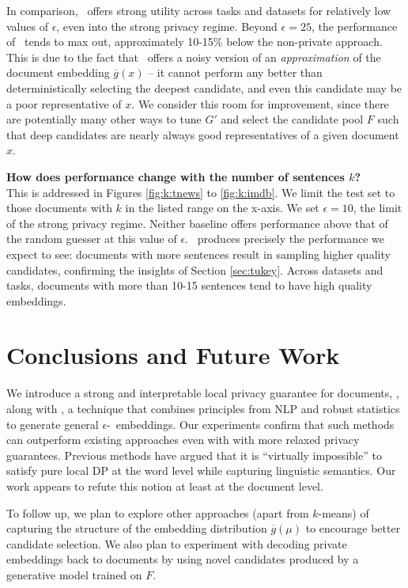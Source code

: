 In comparison, \technique\ offers strong utility across tasks and datasets for relatively low values of $\epsilon$, even into the strong privacy regime. Beyond $\epsilon = 25$, the performance of \technique\ tends to max out, approximately 10-15\% below the non-private approach. This is due to the fact that \technique\ offers a noisy version of an \emph{approximation} of the document embedding $\overline{g}(x)$ -- it cannot perform any better than deterministically selecting the deepest candidate, and even this candidate may be a poor representative of $x$. We consider this room for improvement, since there are potentially many other ways to tune $G'$ and select the candidate pool $F$ such that deep candidates are nearly always good representatives of a given document $x$. 

\noindent\textbf{How does performance change with the number of sentences $k$?}\\
This is addressed in Figures \ref{fig:k:tnews} to \ref{fig:k:imdb}. We limit the test set to those documents with $k$ in the listed range on the x-axis. We set $\epsilon = 10$, the limit of the strong privacy regime. Neither baseline offers performance above that of the random guesser at this value of $\epsilon$.  \technique\ produces precisely the performance we expect to see: documents with more sentences result in sampling higher quality candidates, confirming the insights of Section \ref{sec:tukey}. Across datasets and tasks, documents with more than 10-15 sentences tend to have high quality embeddings. 

\section{Conclusions and Future Work}
\vspace{-0.5em}
We introduce a strong and interpretable local privacy guarantee for documents, \SDP, along with \technique, a technique that combines principles from NLP and robust statistics to generate general $\epsilon$-\SDP\ embeddings. Our experiments confirm that such methods can outperform existing approaches even with with more relaxed privacy guarantees. Previous methods have argued that it is ``virtually impossible'' to satisfy pure local DP \cite{metricdp, mdp_low_dim} at the word level while capturing linguistic semantics. Our work appears to refute this notion at least at the document level. 

To follow up, we plan to explore other approaches (apart from $k$-means) of capturing the structure of the embedding distribution $\overline{g}(\mu)$ to encourage better candidate selection. We also plan to experiment with decoding private embeddings back to documents by using novel candidates produced by a generative model trained on $F$. 

